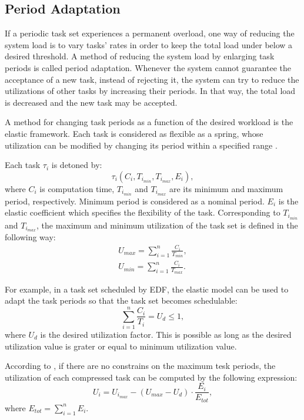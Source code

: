 \newpage
\subsection{Period Adaptation}
If a periodic task set experiences a permanent overload, one way of reducing the system load is to vary tasks' rates in order to keep the total load under below a desired threshold.
A method of reducing the system load by enlarging task periods is called period adaptation. 
Whenever the system cannot guarantee the acceptance of a new task, instead of rejecting it, the system can try to reduce the utilizations of other tasks by increasing their periods. In that way, the total load is decreased and the new task may be accepted.

A method for changing task periods as a function of the desired workload is the elastic framework. Each task is considered as flexible as a spring, whose utilization can be modified by changing its period within a specified range 
\cite{lee2007handbook}.

Each task $\tau_i$ is detoned by:
\begin{equation*}
\tau_i(C_i, T_{i_{min}}, T_{i_{max}}, E_i),
\end{equation*}
where $C_i$ is computation time, $T_{i_{min}}$ and $T_{i_{max}}$ are its minimum and maximum period, respectively.
Minimum period is considered as a nominal period. 
 $E_i$ is the elastic coefficient which specifies the flexibility of the task.
Corresponding to $T_{i_{min}}$ and $T_{i_{max}}$, the maximum and minimum utilization of the task set is defined in the following way:
\begin{align*}
U_{max} = \sum_{i=1}^{n}\frac{C_i}{T_{min}},\\
U_{min} = \sum_{i=1}^{n}\frac{C_i}{T_{max}}.
\end{align*}

For example, in a task set scheduled by EDF, the elastic model can be used to adapt the task periods so that the task set becomes schedulable:
\begin{equation*}
\sum_{i=1}^{n}\frac{C_i}{T_i} = U_d \leq 1,
\end{equation*}
where $U_d$ is the desired utilization factor.
This is possible as long as the desired utilization value is grater or equal to minimum utilization value.

According to \cite{lee2007handbook}, if there are no constrains on the maximum tesk periods, the utilization of each compressed task can be computed by the following expression:
\begin{equation*}
U_i = U_{i_{max}} - ( U_{max} - U_d ) \cdot \frac{E_i}{E_{tot}},
\end{equation*}
where \( E_{tot} = \sum_{i=1}^{n}E_i \).

